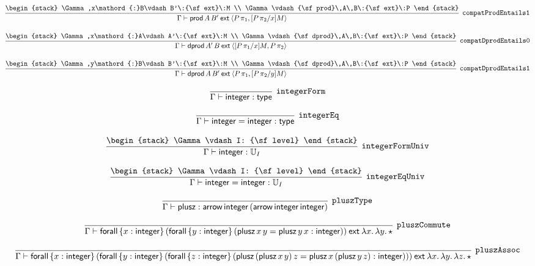 \[
\infer[{\tt compatProdEntails1}]{\Gamma \vdash {\sf prod}\,A\,B'\:{\sf ext}\:\langle P\, \pi_1,[P\, \pi_2/x]M\rangle }{
\begin{stack}
\Gamma ,x\mathord{:}B\vdash B'\:{\sf ext}\:M
\\
\Gamma \vdash {\sf prod}\,A\,B\:{\sf ext}\:P
\end{stack}}
\]

\[
\infer[{\tt compatDprodEntails0}]{\Gamma \vdash {\sf dprod}\,A'\,B\:{\sf ext}\:\langle [P\, \pi_1/x]M,P\, \pi_2\rangle }{
\begin{stack}
\Gamma ,x\mathord{:}A\vdash A'\:{\sf ext}\:M
\\
\Gamma \vdash {\sf dprod}\,A\,B\:{\sf ext}\:P
\end{stack}}
\]

\[
\infer[{\tt compatDprodEntails1}]{\Gamma \vdash {\sf dprod}\,A\,B'\:{\sf ext}\:\langle P\, \pi_1,[P\, \pi_2/y]M\rangle }{
\begin{stack}
\Gamma ,y\mathord{:}B\vdash B'\:{\sf ext}\:M
\\
\Gamma \vdash {\sf dprod}\,A\,B\:{\sf ext}\:P
\end{stack}}
\]

\[
\infer[{\tt integerForm}]{\Gamma \vdash {\sf integer}: {\sf type}}{}
\]

\[
\infer[{\tt integerEq}]{\Gamma \vdash {\sf integer}= {\sf integer}: {\sf type}}{}
\]

\[
\infer[{\tt integerFormUniv}]{\Gamma \vdash {\sf integer}: {\Bbb U}_{I}}{
\begin{stack}
\Gamma \vdash I: {\sf level}
\end{stack}}
\]

\[
\infer[{\tt integerEqUniv}]{\Gamma \vdash {\sf integer}= {\sf integer}: {\Bbb U}_{I}}{
\begin{stack}
\Gamma \vdash I: {\sf level}
\end{stack}}
\]

\[
\infer[{\tt pluszType}]{\Gamma \vdash {\sf plusz}: {\sf arrow}\,{\sf integer}\,({\sf arrow}\,{\sf integer}\,{\sf integer})}{}
\]

\[
\infer[{\tt pluszCommute}]{\Gamma \vdash {\sf forall}\,\{x : {\sf integer}\}\,({\sf forall}\,\{y : {\sf integer}\}\,({\sf plusz}\,x\,y= {\sf plusz}\,y\,x: {\sf integer}))\:{\sf ext}\:\lambda x.\,\lambda y.\,\star }{}
\]

\[
\infer[{\tt pluszAssoc}]{\Gamma \vdash {\sf forall}\,\{x : {\sf integer}\}\,({\sf forall}\,\{y : {\sf integer}\}\,({\sf forall}\,\{z : {\sf integer}\}\,({\sf plusz}\,({\sf plusz}\,x\,y)\,z= {\sf plusz}\,x\,({\sf plusz}\,y\,z): {\sf integer})))\:{\sf ext}\:\lambda x.\,\lambda y.\,\lambda z.\,\star }{}
\]

